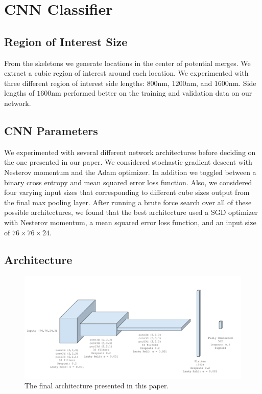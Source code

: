 \section{CNN Classifier}

\subsection{Region of Interest Size}

From the skeletons we generate locations in the center of potential merges. 
We extract a cubic region of interest around each location.
We experimented with three different region of interest side lengths: $800 \textrm{nm}$, $1200 \textrm{nm}$, and $1600 \textrm{nm}$. 
Side lengths of $1600 \textrm{nm}$ performed better on the training and validation data on our network. 

\subsection{CNN Parameters}

We experimented with several different network architectures before deciding on the one presented in our paper. 
We considered stochastic gradient descent with Nesterov momentum and the Adam optimizer.
In addition we toggled between a binary cross entropy and mean squared error loss function.
Also, we considered four varying input sizes that corresponding to different cube sizes output from the final max pooling layer. 
After running a brute force search over all of these possible architectures, we found that the best architecture used a SGD optimizer with Nesterov momentum, a mean squared error loss function, and an input size of $76 \times 76 \times 24$. 

\subsection{Architecture}

\begin{figure}
	\centering
	\includegraphics[width=0.9\linewidth]{./figures/architecture.png}
	\caption{The final architecture presented in this paper.}
	\label{fig:architecture}
\end{figure}


